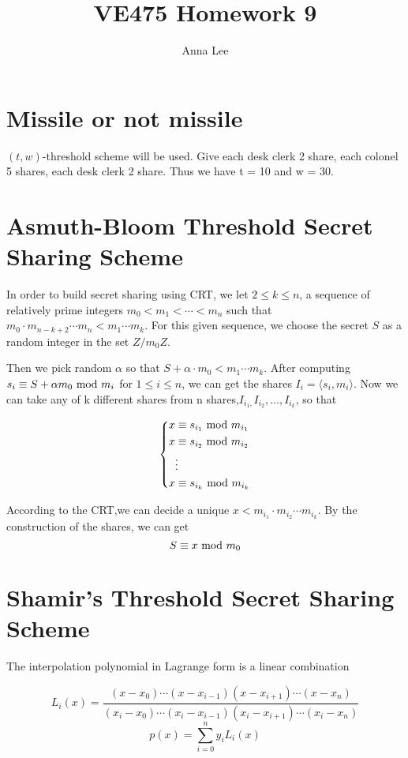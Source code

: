 \documentclass{article}
\title{VE475 Homework 9}
\author{Anna Lee}
\date{}
\renewcommand{\mod}{{\rm\ mod\ }}
\begin{document}
	\maketitle
	
	\section{Missile or not missile}
	
	$(t, w)$-threshold scheme will be used. Give each desk clerk 2 share, each colonel 5 shares, each desk clerk 2 share. Thus we have t = 10 and w = 30.
	
	\section{Asmuth-Bloom Threshold Secret Sharing Scheme}
In order to build secret sharing using CRT, we let $2 \leqslant k \leqslant n$, a sequence of relatively prime integers $m_0<m_1<\cdots<m_n$ such that $m_0\cdot m_{n-k+2}\cdots m_n<m_1\cdots m_k$. For this given sequence, we choose the secret $S$ as a random integer in the set $Z/m_0Z$.
	
	Then we pick random $\alpha$ so that $S+\alpha\cdot m_0<m_1\cdots m_k$. After computing $s_i \equiv S+\alpha m_0 \mod m_i$ for $1\leqslant i\leqslant n$, we can get the shares $I_i=\langle s_i,m_i\rangle$. Now we can take any of k different shares from n shares,$I_{i_1,}I_{i_2},\dots,I_{i_k}$, so that
	
	$$
	\left\{\begin{aligned}
		x &\equiv s_{i_1} \mod m_{i_1} \\
		x &\equiv s_{i_2} \mod m_{i_2} \\
		& \vdots \\
		x &\equiv s_{i_k} \mod m_{i_k} \\
	\end{aligned}\right.
	$$
	
According to the CRT,we can decide a unique $x<m_{i_1}\cdot m_{i_2}\cdots m_{i_k}$. By the construction of the shares, we can get $$S \equiv x \mod m_0$$
	
	\section{Shamir's Threshold Secret Sharing Scheme}
	
	The interpolation polynomial in Lagrange form is a linear combination
	
	$$L_i(x)=\frac{(x-x_0)\cdots(x-x_{i-1})(x-x_{i+1})\cdots(x-x_n)}{(x_i-x_0)\cdots(x_i-x_{i-1})(x_i-x_{i+1})\cdots(x_i-x_n)}$$
	$$$$
	$$p(x)=\sum_{i=0}^n y_iL_i(x)$$
	
\end{document}
